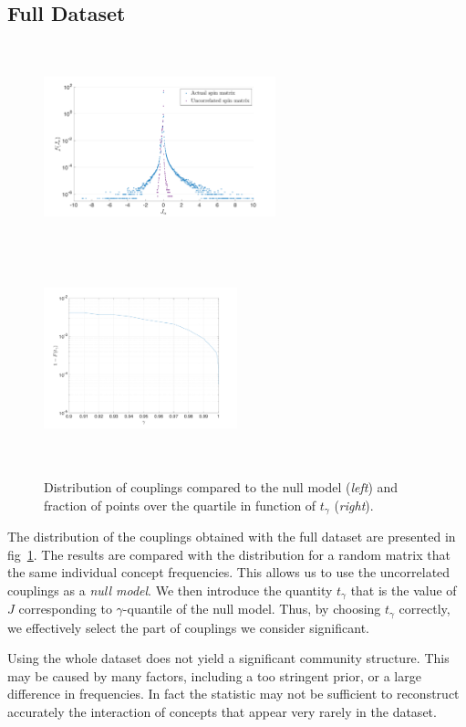 \documentclass[a4paper,12pt,twoside]{article}
\begin{document}
\subsection{Full Dataset}
\begin{figure}
  \centerline{
    \includegraphics[height=6cm,width=0.6\textwidth,keepaspectratio]{../img/distribution_comparison.pdf}
    \includegraphics[height=6cm,width=0.5\textwidth,keepaspectratio]{../img/tscan.pdf}
  }
  \caption{Distribution of couplings compared to the null model ({\em left}) and fraction of points over the quartile in function of $t_\gamma$ ({\em right}).}
  \label{fig:distcomp}
\end{figure}
The distribution of the couplings obtained with the full dataset are presented in fig~\ref{fig:distcomp}. The results are compared with the distribution for a random matrix that the same individual concept frequencies.
This allows us to use the uncorrelated couplings as a {\em null model}.
We then introduce the quantity $t_\gamma$ that is the value of $J$ corresponding to $\gamma$-quantile of the null model.
Thus, by choosing $t_\gamma$ correctly, we effectively select the part of couplings we consider significant.

Using the whole dataset does not yield a significant community structure.
This may be caused by many factors, including a too stringent prior, or a large difference in frequencies. 
In fact the statistic may not be sufficient to reconstruct accurately the interaction of concepts that appear very rarely in the dataset.
\end{document}
